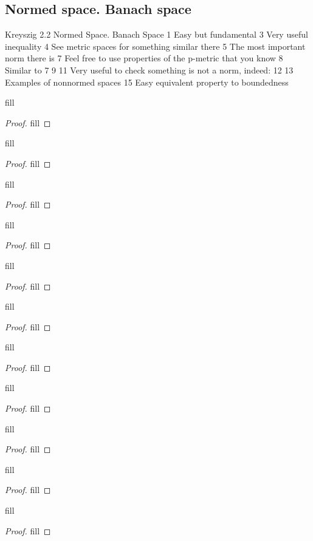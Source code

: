 \subsection{Normed space. Banach space}

Kreyszig 2.2 Normed Space. Banach Space 
1 Easy but fundamental
3 Very useful inequality
4 See metric spaces for something similar there
5 The most important norm there is
7 Feel free to use properties of the p-metric that you know
8 Similar to 7
9
11 Very useful to check something is not a norm, indeed:
12
13 Examples of nonnormed spaces 
15 Easy equivalent property to boundedness

\begin{exercise}{1}
fill
\end{exercise}
\begin{proof}
fill
\end{proof}

\begin{exercise}{3}
fill
\end{exercise}
\begin{proof}
fill
\end{proof}

\begin{exercise}{4}
fill
\end{exercise}
\begin{proof}
fill
\end{proof}

\begin{exercise}{5}
fill
\end{exercise}
\begin{proof}
fill
\end{proof}

\begin{exercise}{7}
fill
\end{exercise}
\begin{proof}
fill
\end{proof}

\begin{exercise}{8}
fill
\end{exercise}
\begin{proof}
fill
\end{proof}

\begin{exercise}{9}
fill
\end{exercise}
\begin{proof}
fill
\end{proof}

\begin{exercise}{11}
fill
\end{exercise}
\begin{proof}
fill
\end{proof}

\begin{exercise}{12}
fill
\end{exercise}
\begin{proof}
fill
\end{proof}

\begin{exercise}{13}
fill
\end{exercise}
\begin{proof}
fill
\end{proof}

\begin{exercise}{15}
fill
\end{exercise}
\begin{proof}
fill
\end{proof}
